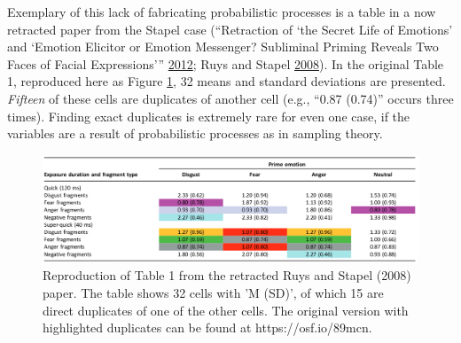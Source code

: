 \documentclass[a5paper]{book}
\begin{document}
Exemplary of this lack of fabricating probabilistic processes is a table
in a now retracted paper from the Stapel case (``Retraction of `the
Secret Life of Emotions' and `Emotion Elicitor or Emotion Messenger?
Subliminal Priming Reveals Two Faces of Facial Expressions'''
\protect\hyperlink{ref-doi:10.1177ux2f0956797612453137}{2012}; Ruys and
Stapel
\protect\hyperlink{ref-doi:10.1111ux2fj.1467-9280.2008.02128.x}{2008}).
In the original Table 1, reproduced here as Figure \ref{fig:ruys}, 32
means and standard deviations are presented. \emph{Fifteen} of these
cells are duplicates of another cell (e.g., \enquote{0.87 (0.74)} occurs
three times). Finding exact duplicates is extremely rare for even one
case, if the variables are a result of probabilistic processes as in
sampling theory.

\begin{figure}

{\centering \includegraphics[width=1\linewidth]{assets/figures/scienceopen-table3} 

}

\caption{Reproduction of Table 1 from the retracted Ruys and Stapel (2008) paper. The table shows 32 cells with 'M (SD)', of which 15 are direct duplicates of one of the other cells. The original version with highlighted duplicates can be found at https://osf.io/89mcn.}\label{fig:ruys}
\end{figure}
\end{document}
